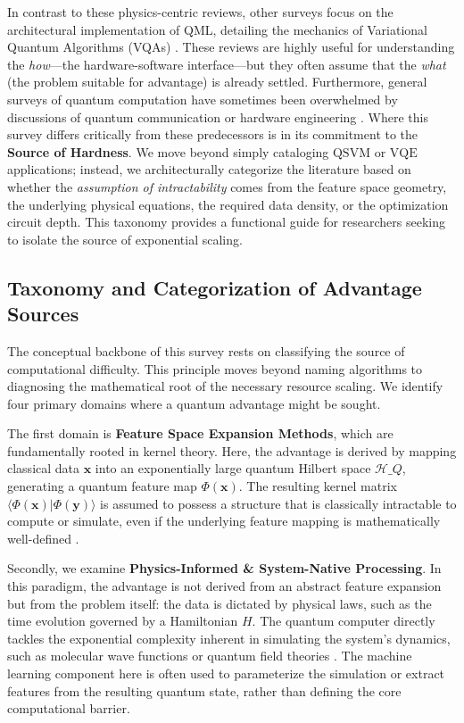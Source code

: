 \documentclass{article}
\begin{document}
In contrast to these physics-centric reviews, other surveys focus on the architectural implementation of QML, detailing the mechanics of Variational Quantum Algorithms (VQAs) \cite{cerezo2021variational}. These reviews are highly useful for understanding the \textit{how}---the hardware-software interface---but they often assume that the \textit{what} (the problem suitable for advantage) is already settled. Furthermore, general surveys of quantum computation have sometimes been overwhelmed by discussions of quantum communication \cite{azuma2023quantum} or hardware engineering \cite{bharti2022noisy}. Where this survey differs critically from these predecessors is in its commitment to the \textbf{Source of Hardness}. We move beyond simply cataloging $\text{QSVM}$ or $\text{VQE}$ applications; instead, we architecturally categorize the literature based on whether the \textit{assumption of intractability} comes from the feature space geometry, the underlying physical equations, the required data density, or the optimization circuit depth. This taxonomy provides a functional guide for researchers seeking to isolate the source of exponential scaling.

\subsection{Taxonomy and Categorization of Advantage Sources}

\label{sec:taxonomy\_and\_categorization\_of\_advantage}

The conceptual backbone of this survey rests on classifying the source of computational difficulty. This principle moves beyond naming algorithms to diagnosing the mathematical root of the necessary resource scaling. We identify four primary domains where a quantum advantage might be sought.

The first domain is \textbf{Feature Space Expansion Methods}, which are fundamentally rooted in kernel theory. Here, the advantage is derived by mapping classical data $\mathbf{x}$ into an exponentially large quantum Hilbert space $\mathcal{H}\_Q$, generating a quantum feature map $\Phi(\mathbf{x})$. The resulting kernel matrix $\langle \Phi(\mathbf{x}) | \Phi(\mathbf{y}) \rangle$ is assumed to possess a structure that is classically intractable to compute or simulate, even if the underlying feature mapping is mathematically well-defined \cite{jager2023universal}.

Secondly, we examine \textbf{Physics-Informed \& System-Native Processing}. In this paradigm, the advantage is not derived from an abstract feature expansion but from the problem itself: the data is dictated by physical laws, such as the time evolution governed by a Hamiltonian $H$. The quantum computer directly tackles the exponential complexity inherent in simulating the system's dynamics, such as molecular wave functions or quantum field theories \cite{kuhne2020electronic}. The machine learning component here is often used to parameterize the simulation or extract features from the resulting quantum state, rather than defining the core computational barrier.
\end{document}

